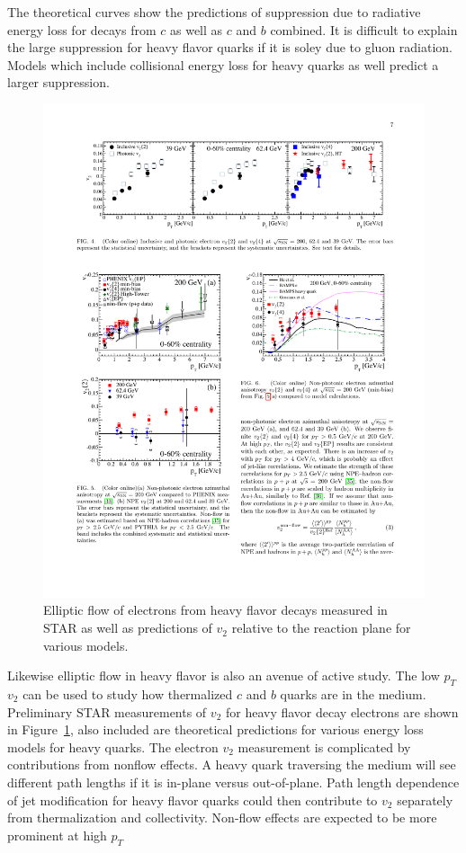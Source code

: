The theoretical curves show the predictions of suppression due to radiative energy loss for decays from $c$ as well as $c$ and $b$ combined. It is difficult to explain the large suppression for heavy flavor quarks if it is soley due to gluon radiation. Models which include collisional energy loss for heavy quarks as well predict a larger suppression.

\begin{figure}[htbp]
\begin{center}
\includegraphics[scale=1.5]{Plots/Intro/npe_v2.pdf}
\end{center}
\caption[NPE $v_2$]{Elliptic flow of electrons from heavy flavor decays measured in STAR as well as predictions of $v_2$ relative to the reaction plane for various models.}
\label{fig:npe_v2_intro}
\end{figure}

Likewise elliptic flow in heavy flavor is also an avenue of active study. The low $p_T$ $v_2$ can be used to study how thermalized $c$ and $b$ quarks are in the medium. Preliminary STAR measurements of $v_2$ for heavy flavor decay electrons are shown in Figure~\ref{fig:npe_v2_intro}, also included are theoretical predictions for various energy loss models for heavy quarks. The electron $v_2$ measurement is complicated by contributions from nonflow effects. A heavy quark traversing the medium will see different path lengths if it is in-plane versus out-of-plane. Path length dependence of jet modification for heavy flavor quarks could then contribute to $v_2$ separately from thermalization and collectivity. Non-flow effects are expected to be more prominent at high $p_T$

